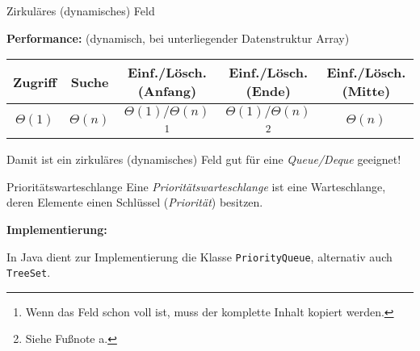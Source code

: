 \begin{defi}{Zirkuläres (dynamisches) Feld}
\begin{center}
    \end{center}

    \textbf{Performance:} (dynamisch, bei unterliegender Datenstruktur Array)

    \begin{center}
        \begin{tabular}{c|c|c|c|c}
            Zugriff     & Suche       & Einf./Lösch. (Anfang)                                                                                   & Einf./Lösch. (Ende)                              & Einf./Lösch. (Mitte) \\
            \hline
            $\Theta(1)$ & $\Theta(n)$ & $\Theta(1)/\Theta(n)$\footnote{Wenn das Feld schon voll ist, muss der komplette Inhalt kopiert werden.} & $\Theta(1)/\Theta(n)$\footnote{Siehe Fußnote a.} & $\Theta(n)$          \\
        \end{tabular}
    \end{center}

    Damit ist ein zirkuläres (dynamisches) Feld gut für eine \emph{Queue/Deque} geeignet!
\end{defi}

\begin{bonus}{Prioritätswarteschlange}
    Eine \emph{Prioritätswarteschlange} ist eine Warteschlange, deren Elemente einen Schlüssel (\emph{Priorität}) besitzen.

    \textbf{Implementierung:}

    In Java dient zur Implementierung die Klasse \texttt{PriorityQueue}, alternativ auch \texttt{TreeSet}.
\end{bonus}

